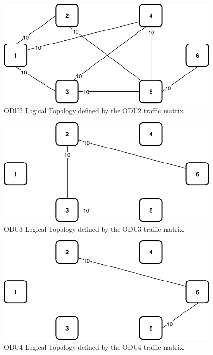 \begin{figure}[h!]
\centering
\includegraphics[width=12cm]{sdf/ilp/opaque_protection/figures/logical_topology_ODU2_medium}
\caption{ODU2 Logical Topology defined by the ODU2 traffic matrix.}
\label{logical_ODU2_protectionmedium}
\end{figure}

\begin{figure}[h!]
\centering
\includegraphics[width=12cm]{sdf/ilp/opaque_protection/figures/logical_topology_ODU3_medium}
\caption{ODU3 Logical Topology defined by the ODU3 traffic matrix.}
\label{logical_ODU3_protectionmedium}
\end{figure}

\begin{figure}[h!]
\centering
\includegraphics[width=12cm]{sdf/ilp/opaque_protection/figures/logical_topology_ODU4_medium}
\caption{ODU4 Logical Topology defined by the ODU4 traffic matrix.}
\label{logical_ODU4_protectionmedium}
\end{figure}

